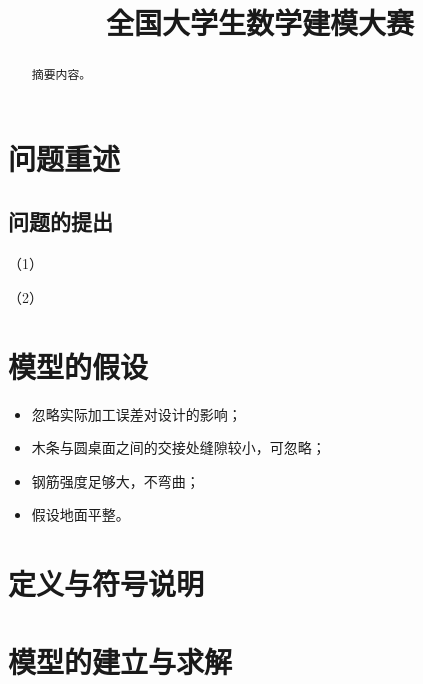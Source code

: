 
\usepackage{url}
\title{全国大学生数学建模大赛}



\maketitle
\begin{abstract}
  摘要内容。

\end{abstract}

\tableofcontents

\section{问题重述}



\subsection*{问题的提出}
（1）

（2）
\section{模型的假设}

\begin{itemize}
\item 忽略实际加工误差对设计的影响；
\item 木条与圆桌面之间的交接处缝隙较小，可忽略；
\item 钢筋强度足够大，不弯曲；
\item 假设地面平整。
\end{itemize}

\section{定义与符号说明}
\begin{center}
\end{center}

\section{模型的建立与求解}

